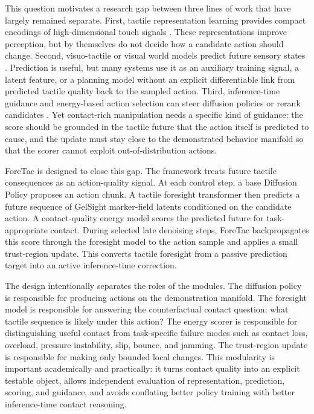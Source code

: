 \documentclass[letterpaper, 10 pt, conference]{ieeeconf}
\newcommand{\method}{ForeTac}
\begin{document}
This question motivates a research gap between three lines of work that have
largely remained separate. First, tactile representation learning provides
compact encodings of high-dimensional touch signals
\cite{higuera2024sparsh,zhao2024t3}. These representations improve perception,
but by themselves do not decide how a candidate action should change. Second,
visuo-tactile or visual world models predict future sensory states
\cite{ebert2018visual,ye2025dreamtacvla,zheng2026omnivta,higuera2026vtwm}.
Prediction is useful, but many systems use it as an auxiliary training signal,
a latent feature, or a planning model without an explicit differentiable link
from predicted tactile quality back to the sampled action. Third,
inference-time guidance and energy-based action selection can steer diffusion
policies or rerank candidates \cite{florence2021ibc,du2025dynaguide,
saxena2025sitcom,zhang2026touchguide}. Yet contact-rich manipulation needs a
specific kind of guidance: the score should be grounded in the tactile future
that the action itself is predicted to cause, and the update must stay close to
the demonstrated behavior manifold so that the scorer cannot exploit
out-of-distribution actions.

\method{} is designed to close this gap. The framework treats future tactile
consequences as an action-quality signal. At each control step, a base
Diffusion Policy proposes an action chunk. A tactile foresight transformer then
predicts a future sequence of GelSight marker-field latents conditioned on the
candidate action. A contact-quality energy model scores the predicted future
for task-appropriate contact. During selected late denoising steps, \method{}
backpropagates this score through the foresight model to the action sample and
applies a small trust-region update. This converts tactile foresight from a
passive prediction target into an active inference-time correction.

The design intentionally separates the roles of the modules. The diffusion
policy is responsible for producing actions on the demonstration manifold. The
foresight model is responsible for answering the counterfactual contact
question: what tactile sequence is likely under this action? The energy scorer
is responsible for distinguishing useful contact from task-specific failure
modes such as contact loss, overload, pressure instability, slip, bounce, and
jamming. The trust-region update is responsible for making only bounded local
changes. This modularity is important academically and practically: it turns
contact quality into an explicit testable object, allows independent evaluation
of representation, prediction, scoring, and guidance, and avoids conflating
better policy training with better inference-time contact reasoning.
\end{document}
